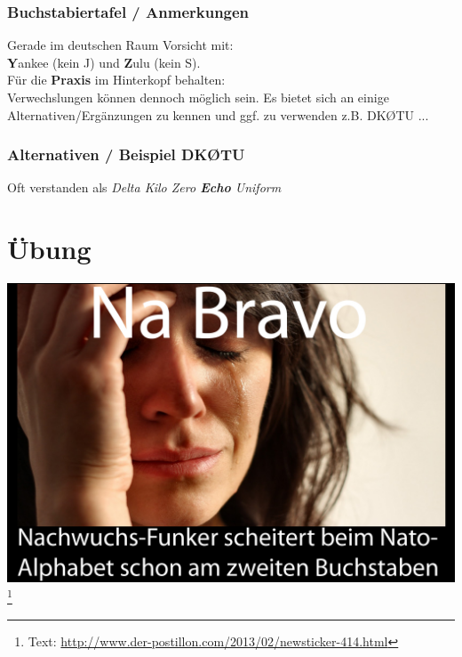 \begin{frame}
    \frametitle{Buchstabiertafel / Anmerkungen}

    Gerade im deutschen Raum Vorsicht mit: \\
    \textbf{Y}ankee (kein J) und \textbf{Z}ulu (kein S). \\[2em]

    Für die \textbf{Praxis} im Hinterkopf behalten: \\
    Verwechslungen können dennoch möglich sein. Es bietet sich an einige
    Alternativen/Ergänzungen zu kennen und ggf. zu verwenden z.B. DKØTU ... \\[2em]

\end{frame}

\begin{frame}
    \frametitle{Alternativen / Beispiel DKØTU}
    
    Oft verstanden als \emph{Delta Kilo Zero \textbf{Echo} Uniform} \\[2em]
    

\end{frame}


\section*{Übung}

\begin{frame}

    \begin{center}
        \includegraphics[width=1\textwidth]{bv02/na_bravo_meme.jpg}
        \footnote{\tiny Text: \url{http://www.der-postillon.com/2013/02/newsticker-414.html}}
    \end{center}

\end{frame}

